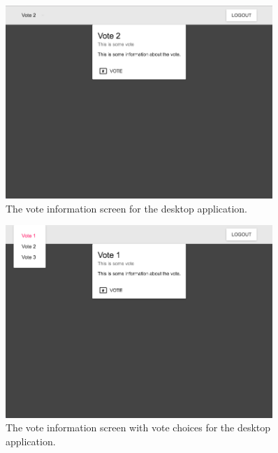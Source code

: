 \documentclass{article}
\begin{document}
\begin{centering}
    \begin{figure}[H]
        \centering
        \includegraphics[width=0.9\textwidth]{screenshots/screen-vote-info}
        \caption{The vote information screen for the desktop application.}
        \label{fig:registration}
    \end{figure}
    
    \begin{figure}[H]
        \centering
        \includegraphics[width=0.9\textwidth]{screenshots/screen-vote-choices}
        \caption{The vote information screen with vote choices for the desktop application.}
        \label{fig:registration}
    \end{figure}
    

\end{centering}
\end{document}
